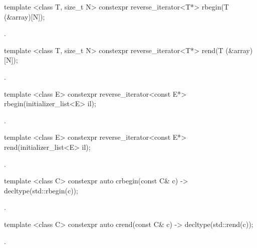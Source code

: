 %
\begin{itemdecl}
template <class T, size_t N> constexpr reverse_iterator<T*> rbegin(T (&array)[N]);
\end{itemdecl}
\begin{itemdescr}
\pnum \returns {}.
\end{itemdescr}

%
\begin{itemdecl}
template <class T, size_t N> constexpr reverse_iterator<T*> rend(T (&array)[N]);
\end{itemdecl}
\begin{itemdescr}
\pnum \returns {}.
\end{itemdescr}

%
\begin{itemdecl}
template <class E> constexpr reverse_iterator<const E*> rbegin(initializer_list<E> il);
\end{itemdecl}
\begin{itemdescr}
\pnum \returns {}.
\end{itemdescr}

%
\begin{itemdecl}
template <class E> constexpr reverse_iterator<const E*> rend(initializer_list<E> il);
\end{itemdecl}
\begin{itemdescr}
\pnum \returns {}.
\end{itemdescr}

%
\begin{itemdecl}
template <class C> constexpr auto crbegin(const C& c) -> decltype(std::rbegin(c));
\end{itemdecl}
\begin{itemdescr}
\pnum \returns {}.
\end{itemdescr}

%
\begin{itemdecl}
template <class C> constexpr auto crend(const C& c) -> decltype(std::rend(c));
\end{itemdecl}
\begin{itemdescr}
\pnum \returns {}.
\end{itemdescr}

